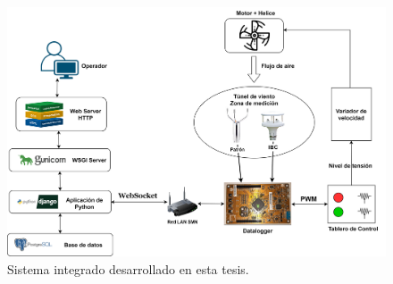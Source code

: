 \begin{figure}[H]
    \centering
    \includegraphics[width=1\linewidth]{Figuras/AplicacionWeb/integracionHardware/DiagramaSistemaDesarrollar.png}
    \caption{Sistema integrado desarrollado en esta tesis.}
    \label{fig:sistemaIntegral}
\end{figure}



